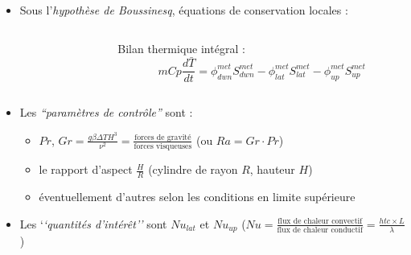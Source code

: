 \begin{frame}[fragile]
\begin{columns}[T]
\begin{column}{0.7\textwidth}
\begin{scriptsize}
\begin{itemize}
    \end{itemize} 
    \end{scriptsize}
    \end{column}
\end{columns}
\begin{itemize}
\item Sous l'\emph{hypothèse de Boussinesq}, équations de conservation locales :
\begin{columns}[T]
    \begin{column}{0.58\textwidth}
    \end{column}
    \begin{column}{0.42\textwidth}
\begin{scriptsize}
    Bilan thermique intégral :
    \begin{equation*} mCp \frac{d\bar{T}}{dt} = \phi^{met}_{dwn} S^{met}_{dwn} - \phi^{met}_{lat} S^{met}_{lat} - \phi^{met}_{up} S^{met}_{up} \end{equation*}
\end{scriptsize}
    \end{column}
\end{columns}
\item Les \emph{``paramètres de contrôle''} sont :
\begin{itemize}
\item $Pr$, $Gr=\frac{g\beta\Delta T H^3}{\nu^2}=\frac{\text{forces de gravité}}{\text{forces visqueuses}}$ (ou $Ra=Gr \cdot Pr$)
\item le rapport d'aspect $\frac{H}{R}$ (cylindre de rayon $R$, hauteur $H$)
\item éventuellement d'autres selon les conditions en limite supérieure
\end{itemize}
\item Les `\emph{`quantités d'intérêt''} sont $Nu_{lat}$ et $Nu_{up}$ ($Nu=\frac{\text{flux de chaleur convectif}}{\text{flux de chaleur conductif}}=\frac{htc \times L}{\lambda}$ )
\end{itemize}
\end{frame}
